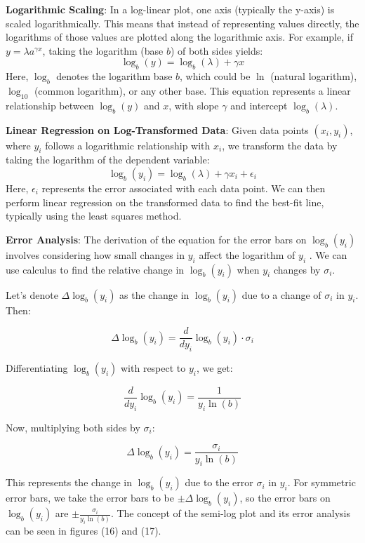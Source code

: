 \documentclass{article}
\begin{document}
\textbf{Logarithmic Scaling}:
In a log-linear plot, one axis (typically the y-axis) is scaled logarithmically. This means that instead of representing values directly, the logarithms of those values are plotted along the logarithmic axis. For example, if $y = \lambda a^{\gamma x}$, taking the logarithm (base $b$) of both sides yields:
     \[ \log_b(y) = \log_b(\lambda) + \gamma x \]
Here, $\log_b$ denotes the logarithm base $b$, which could be $\ln$ (natural logarithm), $\log_{10}$ (common logarithm), or any other base. This equation represents a linear relationship between $\log_b(y)$ and $x$, with slope $\gamma$ and intercept $\log_b(\lambda)$.

\textbf{Linear Regression on Log-Transformed Data}:
Given data points $(x_i, y_i)$, where $y_i$ follows a logarithmic relationship with $x_i$, we transform the data by taking the logarithm of the dependent variable:
     \[ \log_b(y_i) = \log_b(\lambda) + \gamma x_i + \epsilon_i \]
Here, $\epsilon_i$ represents the error associated with each data point. We can then perform linear regression on the transformed data to find the best-fit line, typically using the least squares method.

\textbf{Error Analysis}:
The derivation of the equation for the error bars on $\log_b(y_i)$ involves considering how small changes in $y_i$ affect the logarithm of $y_i$ \cite{stewart2010calculus}\cite{taylor2022introduction}\cite{press2007numerical}. We can use calculus to find the relative change in $\log_b(y_i)$ when $y_i$ changes by $\sigma_i$.

Let's denote $\Delta \log_b(y_i)$ as the change in $\log_b(y_i)$ due to a change of $\sigma_i$ in $y_i$. Then:

\[
\Delta \log_b(y_i) = \frac{d}{dy_i} \log_b(y_i) \cdot \sigma_i
\]

Differentiating $\log_b(y_i)$ with respect to $y_i$, we get:

\[
\frac{d}{dy_i} \log_b(y_i) = \frac{1}{y_i \ln(b)}
\]

Now, multiplying both sides by $\sigma_i$:

\[
\Delta \log_b(y_i) = \frac{\sigma_i}{y_i \ln(b)}
\]

This represents the change in $\log_b(y_i)$ due to the error $\sigma_i$ in $y_i$. For symmetric error bars, we take the error bars to be $\pm \Delta \log_b(y_i)$, so the error bars on $\log_b(y_i)$ are $\pm \frac{\sigma_i}{{y_i \ln(b)}}$\cite{bevington2003data,press2007numerical,taylor2022introduction}. The concept of the semi-log plot and its error analysis can be seen in figures (16) and (17).





\end{document}
